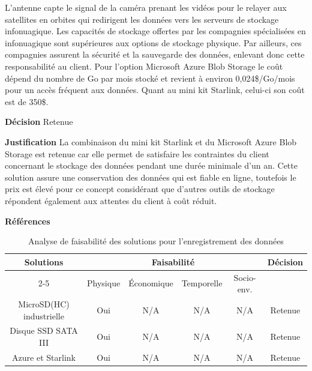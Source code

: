 L'antenne capte le signal de la caméra prenant les vidéos pour le relayer aux satellites en orbites qui redirigent les données vers les serveurs de stockage infonuagique. Les capacités de stockage offertes par les compagnies spécialisées en infonuagique sont supérieures aux options de stockage physique. Par ailleurs, ces compagnies assurent la sécurité et la sauvegarde des données, enlevant donc cette responsabilité au client. Pour l’option Microsoft Azure Blob Storage le coût dépend du nombre de Go par mois stocké et revient à environ 0,024\$/Go/mois pour un accès fréquent aux données. Quant au mini kit Starlink, celui-ci son coût est de 350\$.
\smallskip

\noindent\textbf{Décision} Retenue
\smallskip

\noindent\textbf{Justification} La combinaison du mini kit Starlink et du Microsoft Azure Blob Storage est retenue car elle permet de satisfaire les contraintes du client concernant le stockage des données pendant une durée minimale d’un an. Cette solution assure une conservation des données qui est fiable en ligne, toutefois le prix est élevé pour ce concept considérant que d’autres outils de stockage répondent également aux attentes du client à coût réduit.
\smallskip

\noindent\textbf{Références}

\cite{Nuage1}
\cite{Nuage2}
\cite{Nuage3}



\begin{table}[H]

    \centering

\begin{tabular}{|c|c|c|c|c|c|}
    \hline
    \centering
    \textbf{Solutions} & \multicolumn{4}{c|}{Faisabilité} & \textbf{Décision} \\
    \cline{2-5}
    & Physique & Économique & Temporelle & Socio-env. & \\
    \hline
    MicroSD(HC) industrielle & Oui & N/A & N/A & N/A & Retenue \\
    \hline
    Disque SSD SATA III& Oui & N/A & N/A & N/A & Retenue \\
    \hline
    Azure et Starlink & Oui & N/A & N/A & N/A & Retenue \\
    \hline
\end{tabular}

\caption{Analyse de faisabilité des solutions pour l'enregistrement des données}

\label{tab:faisabiliteStockage}

\end{table}

